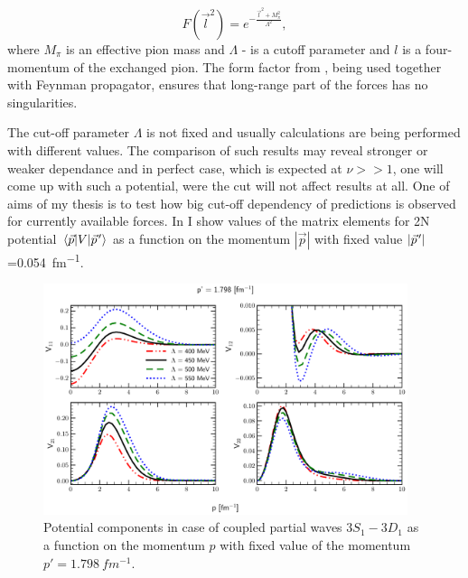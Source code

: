 \begin{equation}
    F(\vec{l}^2) = e^{-\frac{\vec{l}^2 + M_\pi^2}{\Lambda^2}},
    \label{regulator}
\end{equation}
where $M_\pi$ is an effective pion mass and $\Lambda$ - is a cutoff parameter and $l$ is a four-momentum of the exchanged pion.
The form factor from , being used together with Feynman propagator,
ensures that long-range part of the forces has no singularities. 

The cut-off parameter $\Lambda$ is not fixed and usually calculations
are being performed with different values. The comparison
of such results may reveal stronger or weaker dependance and in perfect
case, which is expected at $\nu >> 1$, one will come up with such a potential, were the cut will
not affect results at all. One of aims of my thesis is to test how big cut-off dependency
of predictions is
observed for currently available forces. In  
I show values of the matrix elements for 2N potential $\matrixel{\vec{p}}{V}{\pvec{p}}$
as a function on the momentum $|\vec{p}|$ with fixed value $|\pvec{p}|$=\SI{0.054}{fm^{-1}}.



\begin{figure}[htb]
    \begin{center}
    \includegraphics[width=0.95\textwidth]{PlotData/Deuteron/WAVEFUNC/potential_pp1.798.pdf}
    \end{center}
    \caption{Potential components in case of coupled partial waves $3S_1 - 3D_1$ as a function on the momentum $p$ with fixed
    value of the momentum $p'=\SI{1.798}{fm^{-1}}$.
    }
    \label{potential_cutoff}
\end{figure}



